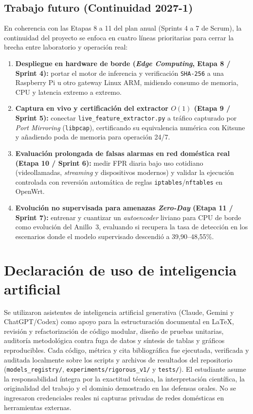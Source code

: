 \documentclass[11pt,a4paper]{article}
\begin{document}
\subsection{Trabajo futuro (Continuidad 2027-1)}
En coherencia con las Etapas 8 a 11 del plan anual (Sprints 4 a 7 de Scrum), la continuidad del proyecto se enfoca en cuatro líneas prioritarias para cerrar la brecha entre laboratorio y operación real:
\begin{enumerate}
  \item \textbf{Despliegue en hardware de borde (\textit{Edge Computing}, Etapa 8 / Sprint 4):} portar el motor de inferencia y verificación \texttt{SHA-256} a una Raspberry Pi u otro gateway Linux ARM, midiendo consumo de memoria, CPU y latencia extremo a extremo.
  \item \textbf{Captura en vivo y certificación del extractor $O(1)$ (Etapa 9 / Sprint 5):} conectar \texttt{live\_feature\_extractor.py} a tráfico capturado por \textit{Port Mirroring} (\texttt{libpcap}), certificando su equivalencia numérica con Kitsune y añadiendo poda de memoria para operación 24/7.
  \item \textbf{Evaluación prolongada de falsas alarmas en red doméstica real (Etapa 10 / Sprint 6):} medir FPR diaria bajo uso cotidiano (videollamadas, \textit{streaming} y dispositivos modernos) y validar la ejecución controlada con reversión automática de reglas \texttt{iptables}/\texttt{nftables} en OpenWrt.
  \item \textbf{Evolución no supervisada para amenazas \textit{Zero-Day} (Etapa 11 / Sprint 7):} entrenar y cuantizar un \textit{autoencoder} liviano para CPU de borde como evolución del Anillo~3, evaluando si recupera la tasa de detección en los escenarios donde el modelo supervisado descendió a 39,90--48,55\%.
\end{enumerate}

\clearpage
{}
{}



\appendix
\section{Declaración de uso de inteligencia artificial}
Se utilizaron asistentes de inteligencia artificial generativa (Claude, Gemini y ChatGPT/Codex) como apoyo para la estructuración documental en LaTeX, revisión y refactorización de código modular, diseño de pruebas unitarias, auditoría metodológica contra fuga de datos y síntesis de tablas y gráficos reproducibles. Cada código, métrica y cita bibliográfica fue ejecutada, verificada y auditada localmente sobre los scripts y archivos de resultados del repositorio (\texttt{models\_registry/}, \texttt{experiments/rigorous\_v1/} y \texttt{tests/}). El estudiante asume la responsabilidad íntegra por la exactitud técnica, la interpretación científica, la originalidad del trabajo y el dominio demostrado en las defensas orales. No se ingresaron credenciales reales ni capturas privadas de redes domésticas en herramientas externas.
\end{document}
